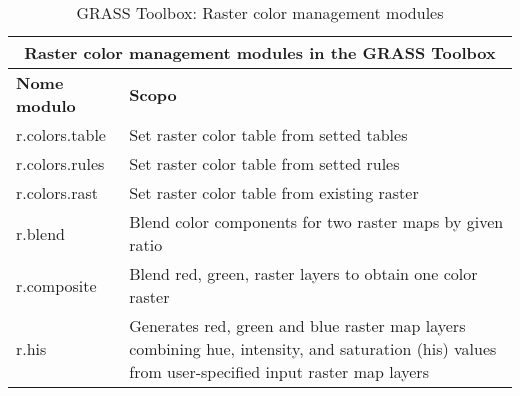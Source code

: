 \begin{table}[ht]
\centering
\caption{GRASS Toolbox: Raster color management modules}\medskip
 \begin{tabular}{|p{4cm}|p{12cm}|}
  \hline \multicolumn{2}{|c|}{\textbf{Raster color management modules in the
  GRASS Toolbox}} \\
  \hline \textbf{Nome modulo} & \textbf{Scopo} \\
  \hline r.colors.table & Set raster color table from setted tables \\
  \hline r.colors.rules & Set raster color table from setted rules \\
  \hline r.colors.rast & Set raster color table from existing raster \\
  \hline r.blend & Blend color components for two raster maps by given ratio \\
  \hline r.composite & Blend red, green, raster layers to obtain one color
  raster \\
  \hline r.his & Generates red, green and blue raster map layers combining
  hue, intensity, and saturation (his) values from user-specified input
  raster map layers \\
\hline
\end{tabular}
\end{table}

